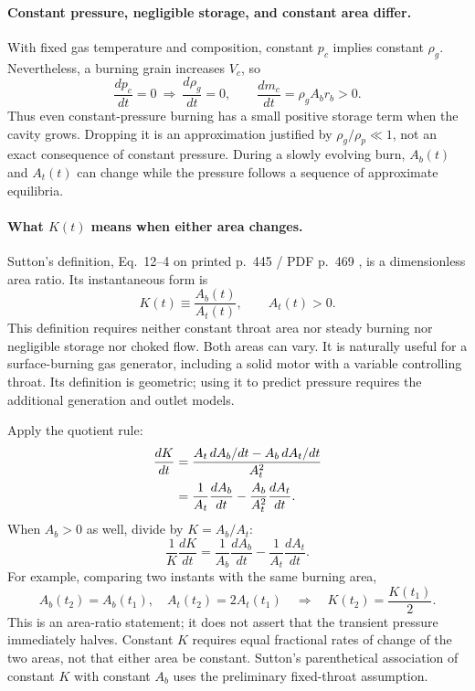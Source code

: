 \paragraph{Constant pressure, negligible storage, and constant area differ.}
With fixed gas temperature and composition, constant $p_c$ implies
constant $\rho_g$. Nevertheless, a burning grain increases $V_c$, so
\[
 \frac{dp_c}{dt}=0
 \ \Longrightarrow\
 \frac{d\rho_g}{dt}=0,\qquad
 \frac{dm_c}{dt}=\rho_g A_b r_b>0.
\]
Thus even constant-pressure burning has a small positive storage term
when the cavity grows. Dropping it is an approximation justified by
$\rho_g/\rho_p\ll1$, not an exact consequence of constant pressure.
During a slowly evolving burn, $A_b(t)$ and $A_t(t)$ can change while
the pressure follows a sequence of approximate equilibria.

\paragraph{What $K(t)$ means when either area changes.}
Sutton's definition, Eq.~12--4 on printed p.~445 / PDF p.~469
\cite{sutton}, is a dimensionless area ratio. Its instantaneous form is
\begin{equation}\label{eq:sb-k-variable}
 \boxed{K(t)\equiv\frac{A_b(t)}{A_t(t)},\qquad A_t(t)>0.}
\end{equation}
This definition requires neither constant throat area nor steady
burning nor negligible storage nor choked flow. Both areas can vary.
It is naturally useful for a surface-burning gas generator, including
a solid motor with a variable controlling throat. Its definition is
geometric; using it to predict pressure requires the additional
generation and outlet models.

Apply the quotient rule:
\begin{align}
 \frac{dK}{dt}
 &=\frac{A_t\,dA_b/dt-A_b\,dA_t/dt}{A_t^2}\notag\\
 &=\frac{1}{A_t}\frac{dA_b}{dt}
   -\frac{A_b}{A_t^2}\frac{dA_t}{dt}.
 \label{eq:sb-k-rate}
\end{align}
When $A_b>0$ as well, divide by $K=A_b/A_t$:
\[
 \frac{1}{K}\frac{dK}{dt}
 =\frac{1}{A_b}\frac{dA_b}{dt}
  -\frac{1}{A_t}\frac{dA_t}{dt}.
\]
For example, comparing two instants with the same burning area,
\[
 A_b(t_2)=A_b(t_1),\quad A_t(t_2)=2A_t(t_1)
 \quad\Longrightarrow\quad K(t_2)=\frac{K(t_1)}{2}.
\]
This is an area-ratio statement; it does not assert that the transient
pressure immediately halves. Constant $K$ requires equal fractional
rates of change of the two areas, not that either area be constant.
Sutton's parenthetical association of constant $K$ with constant $A_b$
uses the preliminary fixed-throat assumption.

